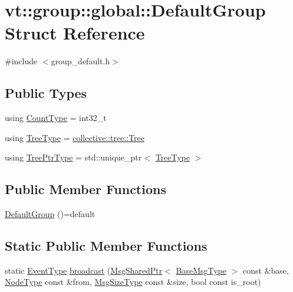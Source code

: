 \hypertarget{structvt_1_1group_1_1global_1_1_default_group}{}\section{vt\+:\+:group\+:\+:global\+:\+:Default\+Group Struct Reference}
\label{structvt_1_1group_1_1global_1_1_default_group}


{\ttfamily \#include $<$group\+\_\+default.\+h$>$}

\subsection*{Public Types}
\begin{DoxyCompactItemize}
\item 
using \hyperlink{structvt_1_1group_1_1global_1_1_default_group_a838e3ed0bd877d6ff703705c00c66e95}{Count\+Type} = int32\+\_\+t
\item 
using \hyperlink{structvt_1_1group_1_1global_1_1_default_group_a86d7ec049ad79c17fcb6b428534d0c1c}{Tree\+Type} = \hyperlink{structvt_1_1collective_1_1tree_1_1_tree}{collective\+::tree\+::\+Tree}
\item 
using \hyperlink{structvt_1_1group_1_1global_1_1_default_group_ab4b43c814196cd22463cfa0caad333d6}{Tree\+Ptr\+Type} = std\+::unique\+\_\+ptr$<$ \hyperlink{structvt_1_1group_1_1global_1_1_default_group_a86d7ec049ad79c17fcb6b428534d0c1c}{Tree\+Type} $>$
\end{DoxyCompactItemize}
\subsection*{Public Member Functions}
\begin{DoxyCompactItemize}
\item 
\hyperlink{structvt_1_1group_1_1global_1_1_default_group_ab21200c02abd2a011352bee173951942}{Default\+Group} ()=default
\end{DoxyCompactItemize}
\subsection*{Static Public Member Functions}
\begin{DoxyCompactItemize}
\item 
static \hyperlink{namespacevt_a009267401def7ae8bf201892222d060f}{Event\+Type} \hyperlink{structvt_1_1group_1_1global_1_1_default_group_a473b19ec41ee9fe654645405a313cca4}{broadcast} (\hyperlink{namespacevt_ab2b3d506ec8e8d1540aede826d84a239}{Msg\+Shared\+Ptr}$<$ \hyperlink{namespacevt_a44d0d4e144748f2b19a1cfd962f50338}{Base\+Msg\+Type} $>$ const \&base, \hyperlink{namespacevt_a866da9d0efc19c0a1ce79e9e492f47e2}{Node\+Type} const \&from, \hyperlink{namespacevt_abfa009d900299ac1df967b40ea8f2c8a}{Msg\+Size\+Type} const \&size, bool const is\+\_\+root)
\end{DoxyCompactItemize}

